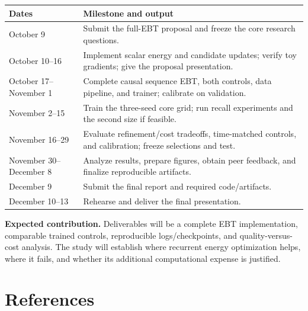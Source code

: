 \documentclass[11pt,letterpaper]{article}
\begin{document}
\smallskip\begin{tabularx}{\textwidth}{@{}p{3.2cm}X@{}}\toprule
\textbf{Dates} & \textbf{Milestone and output}\\\midrule
October 9 & Submit the full-EBT proposal and freeze the core research questions.\\
October 10–16 & Implement scalar energy and candidate updates; verify toy gradients; give the proposal presentation.\\
October 17–November 1 & Complete causal sequence EBT, both controls, data pipeline, and trainer; calibrate on validation.\\
November 2–15 & Train the three-seed core grid; run recall experiments and the second size if feasible.\\
November 16–29 & Evaluate refinement/cost tradeoffs, time-matched controls, and calibration; freeze selections and test.\\
November 30–December 8 & Analyze results, prepare figures, obtain peer feedback, and finalize reproducible artifacts.\\
December 9 & Submit the final report and required code/artifacts.\\
December 10–13 & Rehearse and deliver the final presentation.\\
\bottomrule\end{tabularx}\smallskip

\textbf{Expected contribution.} Deliverables will be a complete EBT implementation, comparable trained controls, reproducible logs/checkpoints, and quality-versus-cost analysis. The study will establish where recurrent energy optimization helps, where it fails, and whether its additional computational expense is justified.

\newpage
\section*{References}
\end{document}
